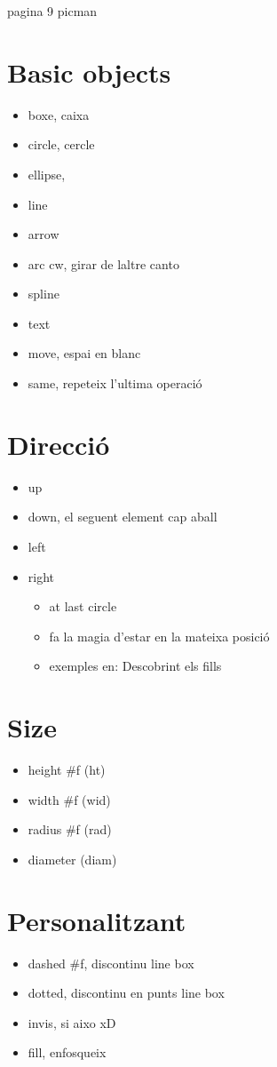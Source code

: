 pagina 9 picman

\section{Basic objects}
\begin{itemize}
\item boxe, caixa
\item circle, cercle
\item ellipse, 
\item line
	\subitem <->
\item arrow
\item arc
	\subitem cw, girar de laltre canto
\item spline
\item text
\item move, espai en blanc
\item same, repeteix l'ultima operació
\end{itemize}

\section{Direcció}
\begin{itemize}
\item up
\item down, el seguent element cap aball
\item left
\item right
	\begin{itemize}
	\item at last circle
	\item fa la magia d'estar en la mateixa posició
	\item exemples en: Descobrint els fills
	\end{itemize}
\end{itemize}

\section{Size}
\begin{itemize}
\item height #f (ht)
\item width #f (wid)
\item radius #f (rad)
\item diameter (diam)
\end{itemize}

\section{Personalitzant}
\begin{itemize}
\item dashed #f, discontinu
	\subitem line
	\subitem box
\item dotted, discontinu en punts
	\subitem line
	\subitem box
\item invis, si aixo xD
\item fill, enfosqueix
\end{itemize}

